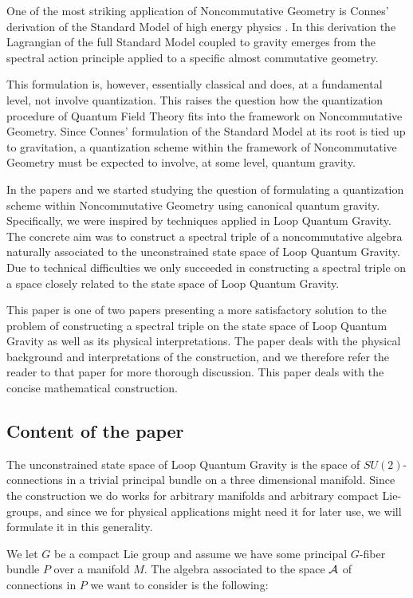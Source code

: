 \documentclass[12pt]{article}
\def\ca{{\cal A}}
\begin{document}
One of the most striking application of Noncommutative Geometry \cite{Co} is Connes' derivation of the Standard Model of high energy physics \cite{Co2,CCM}. In this derivation the Lagrangian of the full Standard Model coupled to gravity emerges from the spectral action principle \cite{AC1} applied to a specific almost commutative geometry. 

This formulation is, however, essentially classical and does, at a fundamental level, not involve quantization. This raises the question how the quantization procedure of Quantum Field Theory fits into the framework on Noncommutative Geometry. Since Connes' formulation of the Standard Model at its root is tied up to gravitation, a quantization scheme within the framework of Noncommutative Geometry must be expected to involve, at some level, quantum gravity.


In the papers \cite{AG1} and \cite{AG2} we  started studying the question of formulating a quantization scheme within  Noncommutative Geometry using canonical quantum gravity. Specifically, we were inspired by techniques applied in Loop Quantum Gravity. The concrete aim was to construct a spectral triple of a noncommutative algebra naturally associated to the unconstrained state space of Loop Quantum Gravity. Due to technical difficulties we only succeeded in constructing a spectral triple on a space closely related to the state space of Loop Quantum Gravity.

This paper is  one of two papers presenting a more satisfactory solution to the problem of constructing a spectral triple on the state space of Loop Quantum Gravity as well as its physical interpretations. The paper \cite{AGN1} deals with the physical background and interpretations of the construction, and we therefore refer the reader to that paper for more thorough discussion. This paper deals with the concise mathematical construction.  

\subsection{Content of the paper}  
 The unconstrained state space of Loop Quantum Gravity is the space of $SU(2)$-connections in a trivial principal bundle on a three dimensional manifold. Since the construction we do works for  arbitrary manifolds  and arbitrary compact Lie-groups, and since we for physical applications might need it for later use, we will formulate it in this generality.

We let $G$ be a compact Lie group and assume we have some principal $G$-fiber bundle $P$ over a manifold $M$. The algebra associated to the space $\ca$ of connections in $P$  we want to consider is the following:
\end{document}
